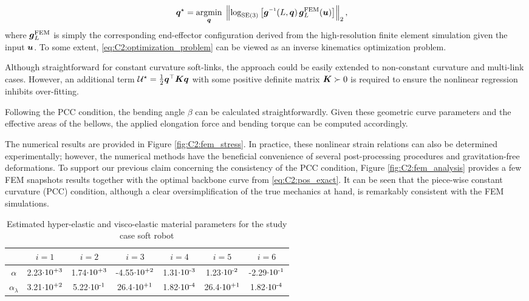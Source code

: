 %
\begin{align}
\q^\star & = \underset{\q}{\textrm{argmin}}\;  \left \lVert \log_{\SE{3}}\left[ \gB\inv(L,\q)\,\gB_L^{\textrm{FEM}}(\vec{u}) \right] \right \rVert_2,
\label{eq:C2:optimization_problem}
\end{align}
%
where ${\boldsymbol{g}}_L^{\textrm{FEM}}$ is simply the corresponding end-effector configuration derived from the high-resolution finite element simulation given the input ${\boldsymbol{u}}$. To some extent, \eqref{eq:C2:optimization_problem} can be viewed as an inverse kinematics optimization problem.
\vfill

\begin{rmk} Although straightforward for constant curvature soft-links, the approach could be easily extended to non-constant curvature and multi-link cases. However, an additional term $\mathcal{U}^\star = \tfrac{1}{2} {\boldsymbol{q}}^\top\boldsymbol{K}{\boldsymbol{q}}$ with some positive definite matrix $\boldsymbol{K} \succ 0 $ is required to ensure the nonlinear regression inhibits over-fitting.
\end{rmk}

Following the PCC condition, the bending angle $\beta$ can be calculated straightforwardly. Given these geometric curve parameters and the effective areas of the bellows, the applied elongation force and bending torque can be computed accordingly.

The numerical results are provided in Figure \ref{fig:C2:fem_stress}. In practice, these nonlinear strain relations can also be determined experimentally; however, the numerical methods have the beneficial convenience of several post-processing procedures and gravitation-free deformations. To support our previous claim concerning the consistency of the PCC condition, Figure \ref{fig:C2:fem_analysis} provides a few FEM snapshots results together with the optimal backbone curve from \eqref{eq:C2:pos_exact}. It can be seen that the piece-wise constant curvature (PCC) condition, although a clear oversimplification of the true mechanics at hand, is remarkably consistent with the FEM simulations.
\begin{table}[!t]
\caption{Estimated hyper-elastic and visco-elastic material parameters for the study case soft robot \label{tab:C2:elastic_parameters}}
\centering
\begin{tabular}{ccccccc}
\hline
& $i=1$ &  $i=2$ &  $i=3$ & $i=4$ &  $i=5$ & $i=6$ \\
\hline
\hline
$\alpha$ &  \small{2.23}$\cdot10^{\textrm{+3}}$  & \small{1.74}$\cdot10^{\textrm{+3}}$  &  \small{-4.55}$\cdot10^{\textrm{+2}}$ & \small{1.31}$\cdot10^{\textrm{-3}}$  & \small{1.23}$\cdot10^{\textrm{-2}}$ & \small{-2.29}$\cdot10^{\textrm{-1}}$ \\[0.15em]
 $\alpha_\lambda$ &  \small{3.21}$\cdot10^{\textrm{+2}}$ & \small{5.22}$\cdot10^{\textrm{-1}}$ &  \small{26.4}$\cdot10^{\textrm{+1}}$& \small{1.82}$\cdot10^{\textrm{-4}}$ & \small{26.4}$\cdot10^{\textrm{+1}}$ & \small{1.82}$\cdot10^{\textrm{-4}}$ \\
\hline
\end{tabular}
\vspace{-3mm}
\end{table}
%
